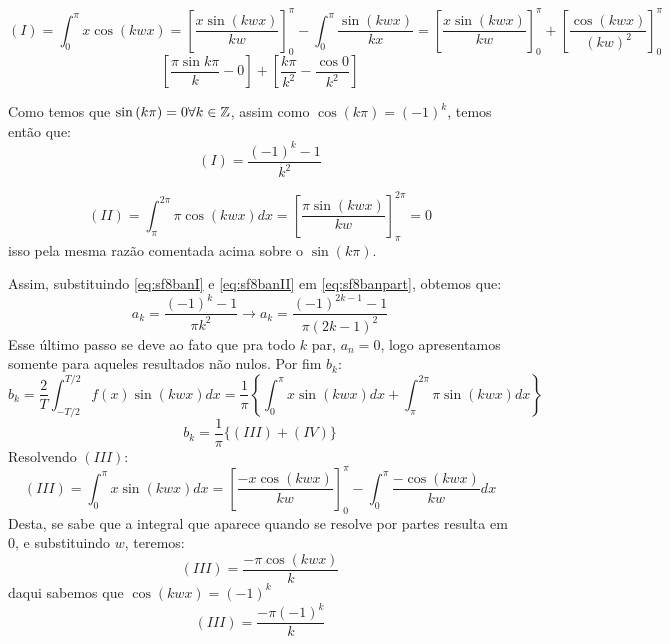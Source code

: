 \begin{equation*}
    (I) = \int_0^\pi x\cos{(kwx)} = \left[\frac{x\sin{(kwx)}}{kw}\right]^\pi_0 - \int^{\pi}_0\frac{\sin{(kwx)}}{kx} = \left[\frac{x\sin{(kwx)}}{kw}\right]^\pi_0 + \left[\frac{\cos{(kwx)}}{(kw)^2}\right]^\pi_0
\end{equation*}
\begin{equation*}
    \left[\frac{\pi\sin{k\pi}}{k} - 0 \right] + \left[\frac{k\pi}{k^2} - \frac{\cos0}{k^2}\right]
\end{equation*}

Como temos que $\sin{(k\pi) } = 0\forall k \in \mathbb{Z}$, assim como $\cos{(k\pi)} = (-1)^k$, temos então que:
\begin{equation}
    \label{eq:sf8banI}
    (I) = \frac{(-1)^k - 1}{k^2}
\end{equation}

\begin{equation}
    \label{eq:sf8banII}
    (II) = \int_\pi^{2\pi} \pi\cos{(kwx)}dx = \left[\frac{\pi\sin{(kwx)}}{kw}\right]^{2\pi}_\pi = 0
\end{equation}
isso pela mesma razão comentada acima sobre o $\sin{(k\pi)}$.

Assim, substituindo \ref{eq:sf8banI} e \ref{eq:sf8banII} em \ref{eq:sf8banpart}, obtemos que:
\begin{equation}
    \label{eq:sf8ban}
    a_k = \frac{(-1)^k - 1}{\pi k^2} \xrightarrow{} \boxed{a_k = \frac{(-1)^{2k-1} - 1}{\pi (2k-1)^2}}
\end{equation}
Esse último passo se deve ao fato que pra todo $k$ par, $a_n = 0$, logo apresentamos somente para aqueles resultados não nulos. 
Por fim $b_k$:
\begin{equation*}
    b_k = \frac{2}{T}\int^{T/2}_{-T/2} f(x)\sin{(kwx)dx} = \frac{1}{\pi}\left\{\int^\pi_0 x\sin{(kwx)}dx + \int_\pi^{2\pi} \pi \sin{(kwx)}dx\right\}
\end{equation*}
\begin{equation}
    \label{eq:sf8bbks}
    b_k = \frac{1}{\pi}\{(III) + (IV)\}
\end{equation}
Resolvendo $(III)$:
\begin{equation*}
    (III) = \int^\pi_0 x\sin{(kwx)}dx = \left[\frac{-x\cos{(kwx)}}{kw}\right]^\pi_0 - \int^\pi_0 \frac{-\cos{(kwx)}}{kw}dx
\end{equation*}
Desta, se sabe que a integral que aparece quando se resolve por partes resulta em $0$, e substituindo $w$, teremos:
\begin{equation*}
    (III) = \frac{-\pi\cos{(kwx)}}{k}
\end{equation*}
daqui sabemos que $\cos{(kwx)} = (-1)^k$
\begin{equation}
   \label{eq:sf8bbn3}
   (III) = \frac{-\pi(-1)^k}{k}
\end{equation}

